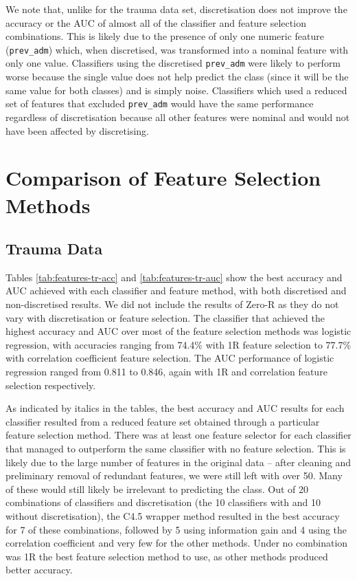 We note that, unlike for the trauma data set, discretisation does not improve
the accuracy or the AUC of almost all of the classifier and feature selection
combinations. This is likely due to the presence of only one numeric feature
(\texttt{prev\_adm}) which, when discretised, was transformed into a nominal
feature with only one value. Classifiers using the discretised
\texttt{prev\_adm} were likely to perform worse because the single value does
not help predict the class (since it will be the same value for both classes)
and is simply noise. Classifiers which used a reduced set of features that
excluded \texttt{prev\_adm} would have the same performance regardless of
discretisation because all other features were nominal and would not have been
affected by discretising.

\section{Comparison of Feature Selection Methods}
\subsection{Trauma Data}
Tables \ref{tab:features-tr-acc} and \ref{tab:features-tr-auc} show the
best accuracy and AUC achieved with each classifier and feature method, with
both discretised and non-discretised results. We did not include the results of
Zero-R as they do not vary with discretisation or feature selection.
The classifier that achieved the
highest accuracy and AUC over most of the feature selection methods was
logistic regression, with accuracies ranging from 74.4\% with 1R feature
selection to 77.7\% with correlation coefficient feature selection. The AUC
performance of logistic regression ranged from 0.811 to 0.846, again with
1R and correlation feature selection respectively.



As indicated by italics in the tables, the best accuracy and AUC results for
each classifier resulted from a reduced feature set obtained through a
particular feature selection method. There was at least one feature selector
for each classifier that managed to outperform the same classifier with
no feature selection. This is likely due to the large number of features in
the original data -- after cleaning and preliminary removal of redundant
features, we were still left with over 50. Many of these would still likely
be irrelevant to predicting the class.
Out of 20 combinations of classifiers
and discretisation (the 10 classifiers with and 10 without
discretisation), the C4.5 wrapper method resulted in the best
accuracy for 7 of these combinations, followed by 5 using information gain
and 4 using the correlation coefficient and very few for the other methods.
Under no combination was 1R the best feature selection method to use, as other
methods produced better accuracy.

